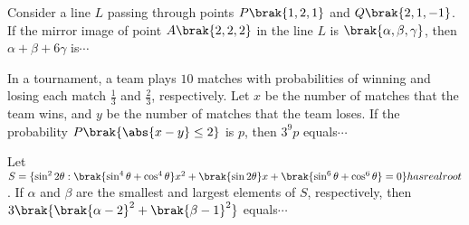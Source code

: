     \item Consider a line $L$ passing through points $P\brak{1, 2, 1}$ and $Q\brak{2, 1, -1}$. If the mirror image of point $A\brak{2, 2, 2}$ in the line $L$ is $\brak{\alpha, \beta, \gamma}$, then $\alpha + \beta + 6\gamma$ is$\cdots$
    \hfill{}

    \item In a tournament, a team plays $10$ matches with probabilities of winning and losing each match $\frac{1}{3}$ and $\frac{2}{3}$, respectively. Let $x$ be the number of matches that the team wins, and $y$ be the number of matches that the team loses. If the probability $P\brak{\abs{x - y} \leq 2}$ is $p$, then $3^9p$ equals$\cdots$
   \hfill{}

    \item Let $S = \{ \sin^2 2\theta:\brak{\sin^4 \theta +\cos^4
	    \theta}x^2+\brak{ \sin2 \theta}x +\brak{\sin^6 \theta+  \cos^6\theta} = 0 \} has real root$. If $\alpha$ and $\beta$ are the smallest and largest elements of $S$, respectively, then $3\brak{\brak{\alpha - 2}^2 + \brak{\beta - 1}^2}$ equals$\cdots$
    \hfill{}

